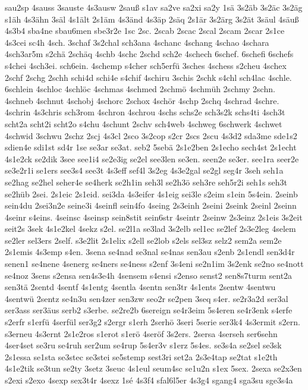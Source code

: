 {sau2sp
4sauss
3sauste
4s3ausw
2sauß
s1av
sa2ve
sa2xi
sa2y
1sä
3s2äb
3s2äc
3s2äg
s1äh
4s3ähn
3säl
4s1ält
2s1äm
4s3änd
4s3äp
2säq
2s1är
3s2ärg
3s2ät
3säul
4säuß
4s3b4
sba4ne
sbau6men
sbe3r2e
1sc
2sc.
2scab
2scac
2scal
2scam
2scar
2s1ce
4s3cei
sc4h
4sch.
3schaf
3s2chal
sch3ana
4schanc
4schang
4schao
4schara
4sch3ar5m
s2chä
2schäq
4schb
4schc
2schd
sch2e
4schech
6schef.
6schefi
6schefs
s4chei
4sch3ei.
sch6ein.
4schemp
s4cher
sch5erfü
3sches
4schess
s2cheu
4schex
2schf
2schg
2schh
schi4d
schi4e
s4chif
4schiru
3schis
2schk
s4chl
sch4lac
4schle.
6schlein
4schloc
4schlöc
4schmas
4schmed
2schmö
4schmüh
2schmy
2schn.
4schneb
4schnut
4schobj
4schorc
2schox
4schör
4schp
2schq
4schrad
4schre.
4schrin
4s3chris
sch3rom
4schron
4schrou
4schs
schs2e
sch3s2k
schs4ti
4sch3t
scht2a
scht2i
scht2o
s4chu
4schunt
2schv
sch4web
4schweg
6schwerk
4schwet
4schwid
3schwu
2schz
2scj
4s3cl
2sco
3s2cop
s2cr
2scs
2scu
4s3d2
sda3me
sde1s2
sdien4e
sdi1st
sd4r
1se
se3ar
se3at.
seb2
5sebä
2s1e2ben
2s1echo
sech4st
2s1echt
4s1e2ck
se2dik
3see
see1i4
se2e3ig
se2el
see3len
se3en.
seen2e
se3er.
see1ra
seer2e
se3e2r1i
se1ers
see3s4
see3t
4s3eff
sef4l
3s2eg
4s3e2gal
se2gl
seg4r
3seh
seh1a
se2hag
se2hel
seher4e
se4herk
se2h1in
seh3l
se2h3ö
seh3re
seh5r2i
seh1s
seh3t
se2hüb
2sei.
2s1eic
2s1eid.
sei3da
4s3eifer
4s1eig
sei3le
s2eim
s1ein
5s4ein.
2seinb
sein4du
2sei3n2e
seine3i
4seinfl
sein4fo
4seing
2s3einh
2seini
2seink
2seinl
2seinn
4seinr
s4eins.
4seinsc
4seinsp
sein8stit
sein6str
4seintr
2seinw
2s3einz
2s1eis
3s2eit
seit2s
3sek
4s1e2kel
4sekz
s2el.
se2l1a
se3lad
3s2elb
sel1ec
se2lef
2s3e2leg
4selem
se2ler
sel3ers
2self.
s3e2lit
2s1elix
s2ell
se2lob
s2els
sel3sz
selz2
sem2a
sem2e
2s1emis
4s3emp
s4en.
3sena
se4nad
se3nal
se4nas
sen3au
s2enb
2s1endl
sen3d4r
senen1
se4nene
4senerg
se4ners
se4ness
s2enf
3s4eni
se2n1im
3s2enk
se2no
se4nott
se4noz
3sens
s2ensa
sen4s3e4h
4sensem
s4ensi
s2enso
senst2
sen8s7turm
sent2a
sen3tä
2sentd
4sentf
4s1entg
4sentla
4sentn
sen3tr
4s1ents
2sentw
4sentwu
4sentwü
2sentz
se4n3u
sen4zer
sen3zw
seo2r
se2pen
3seq
s4er.
se2r3a2d
ser3al
ser3ass
ser3äus
serb2
s3erbe.
se2re2b
6sereign
se4r3eim
5s4eren
se4r3enk
s4erfe
s2erfr
s1erfü
4serfül
ser3g2
s2ergr
s1erh
2serhö
3seri
5serie
ser3k4
4s3ermit
s2ern.
s3erneu
4s3ernt
2s1e2ros
s1erot
s1erö
4seröf
3s2ers.
2sersa
4serseh
ser6sehn
4ser4set
se3ru
se4ruh
ser2um
se4rup
5s4er3v
s1erz
5s4es.
se3s4a
se2sel
se3sk
2s1essa
se1sta
se3stec
se3stei
se5stemp
sest3ri
set2a
2s3e4tap
se2tat
s1e2th
4s1e2tik
se3tun
se2ty
3setz
3seuc
4s1eul
seum4sc
se1u2n
s1ex
5sex.
2sexa
se2x3en
s2exi
s2exo
4sexp
sex3t4r
4sexz
1sé
4s3f4
sfal6l5er
4s3g4
sgang4
sga3su
sge3s4a
}
